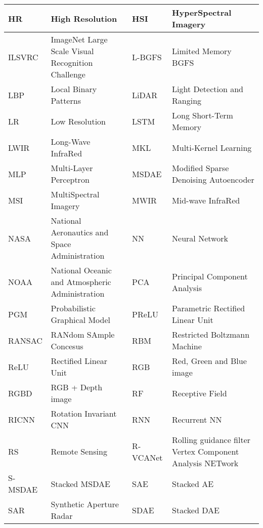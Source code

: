 \documentclass[12pt]{spieman}
\begin{document}
\begin{spacing}{1}
\begin{center}
\begin{longtable}{|p{1.5cm}|p{5.5cm}|p{1.5cm}|p{5.5cm}|}
HR        & High Resolution &                                          HSI       & HyperSpectral Imagery \\  \hline
ILSVRC    & ImageNet Large Scale Visual Recognition Challenge &        L-BGFS    & Limited Memory BGFS \\  \hline
LBP       & Local Binary Patterns &                                    LiDAR     & Light Detection and Ranging \\  \hline
LR        & Low Resolution &                                           LSTM      & Long Short-Term Memory \\  \hline
LWIR      & Long-Wave InfraRed &                                       MKL       & Multi-Kernel Learning \\  \hline
MLP       & Multi-Layer Perceptron &                                   MSDAE     & Modified Sparse Denoising Autoencoder \\  \hline
MSI       & MultiSpectral Imagery   &                                  MWIR      & Mid-wave InfraRed \\  \hline
NASA      & National Aeronautics and Space Administration &            NN        & Neural Network \\  \hline
NOAA      & National Oceanic and Atmospheric Administration &          PCA       & Principal Component Analysis \\  \hline
PGM       & Probabilistic Graphical Model &                            PReLU     & Parametric Rectified Linear Unit \\  \hline
RANSAC    & RANdom SAmple Concesus &                                   RBM       & Restricted Boltzmann Machine   \\  \hline
ReLU      & Rectified Linear Unit &                                    RGB       & Red, Green and Blue image \\  \hline
RGBD      & RGB + Depth image &                                        RF        & Receptive Field \\  \hline
RICNN     & Rotation Invariant CNN &                                   RNN       & Recurrent NN \\  \hline
RS        & Remote Sensing &                                           R-VCANet  & Rolling guidance filter Vertex Component Analysis NETwork \\  \hline
S-MSDAE   & Stacked MSDAE &                                            SAE       & Stacked AE \\  \hline
SAR       & Synthetic Aperture Radar &                                 SDAE      & Stacked DAE \\  \hline

\end{longtable}
\end{center}
\end{spacing}
\end{document}
